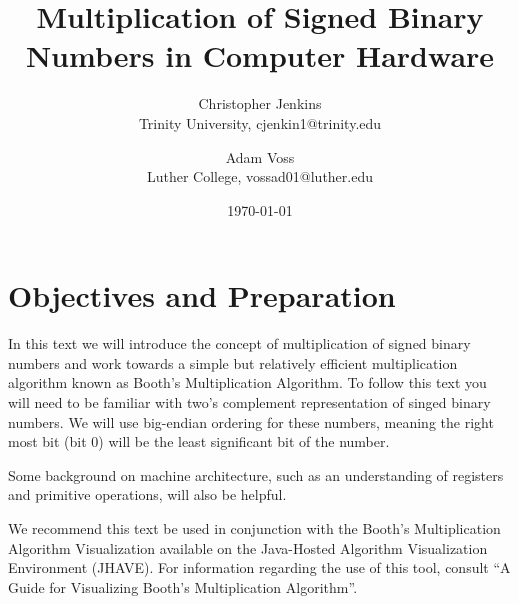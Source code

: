 \documentclass{article}
\title{Multiplication of Signed Binary Numbers in Computer Hardware}
\date{\today}
\author{Christopher Jenkins\\ Trinity University, cjenkin1@trinity.edu
    \and Adam Voss\\ Luther College, vossad01@luther.edu}
\begin{document}
\maketitle
\tableofcontents

\pagebreak

\section{Objectives and Preparation}
In this text we will introduce the concept of multiplication of signed binary numbers and work towards a simple but relatively efficient multiplication algorithm known as Booth's Multiplication Algorithm.
To follow this text you will need to be familiar with two's complement representation of singed binary numbers.
We will use big-endian ordering for these numbers, meaning the right most bit (bit 0) will be the least significant bit of the number.

Some background on machine architecture, such as an understanding of registers and primitive operations, will also be helpful.

We recommend this text be used in conjunction with the Booth’s Multiplication Algorithm Visualization available on the Java-Hosted Algorithm Visualization Environment (JHAVE).
For information regarding the use of this tool, consult ``A Guide for Visualizing Booth’s Multiplication Algorithm''.

\end{document}
